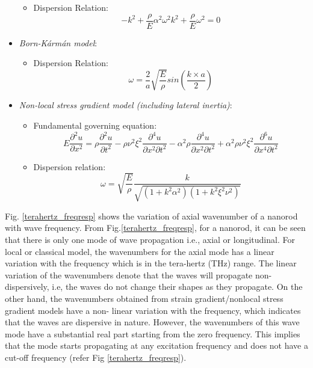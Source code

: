 \begin{itemize}
\begin{itemize}
	\item Dispersion Relation:\\
	\begin{equation}
	-k^2 + \frac{\rho}{E}\alpha^2 \omega^2 k^2 +\frac{\rho}{E}\omega^2 = 0
	\end{equation}
	\end{itemize}
\item \textit{Born-K\'arm\'an model}:\\
	\begin{itemize}
	\item Dispersion Relation:\\
	\begin{equation}
	\omega = \frac{2}{a}\sqrt{\frac{E}{\rho}} sin\left(\frac{k\times a}{2}\right)
	\end{equation}
	\end{itemize}
\item \textit{Non-local stress gradient model (including lateral inertia)}:
	\begin{itemize}
	\item Fundamental governing equation:\\
	\begin{equation}
E \frac{\partial^2 u}{\partial x^2} = \rho \frac{\partial^2 u}{\partial t^2} - \rho \nu^2 \xi^2 \frac{\partial^4 u}{\partial x^2 \partial t^2} - \alpha^2 \rho \frac{\partial^4 u}{\partial x^2 \partial t^2} + \alpha^2 \rho \nu^2 \xi^2 \frac{\partial^6 u}{\partial x^4 \partial t^2}	
	\end{equation}
	\item Dispersion relation:\\
	\begin{equation}
	\omega = \sqrt{\dfrac{E}{\rho}} \dfrac{k}{\sqrt{(1+k^2 \alpha^2)(1+k^2 \xi^2 \nu^2)}}
	\end{equation}
	\end{itemize}
\end{itemize}

Fig. \ref{terahertz_freqresp} shows the variation of axial wavenumber of a nanorod with wave frequency. From Fig.\ref{terahertz_freqresp}, for a nanorod, it can be seen that there is only one mode of wave propagation i.e., axial or longitudinal. For local
or classical model, the wavenumbers for the axial mode has a linear
variation with the frequency which is in the tera-hertz (THz) range.
The linear variation of the wavenumbers denote that the waves will
propagate non-dispersively, i.e, the waves do not change their shapes
as they propagate. On the other hand, the wavenumbers obtained
from strain gradient/nonlocal stress gradient models have a non-
linear variation with the frequency, which indicates that the waves
are dispersive in nature. However, the wavenumbers of this wave
mode have a substantial real part starting from the zero frequency.
This implies that the mode starts propagating at any excitation
frequency and does not have a cut-off frequency (refer Fig \ref{terahertz_freqresp}).

